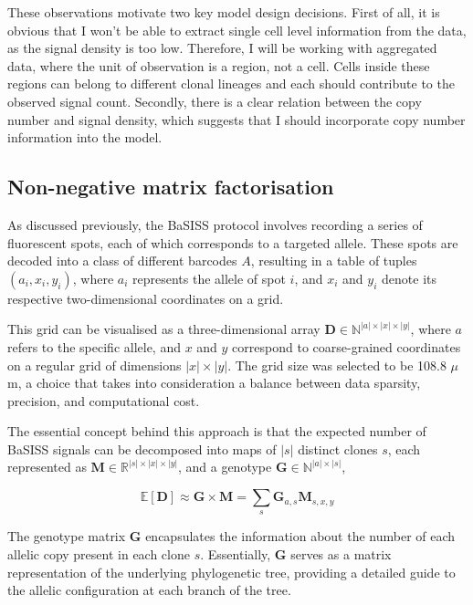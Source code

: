 These observations motivate two key model design decisions. First of all, it is obvious that I won't be able to extract single cell level information from the data, as the signal density is too low. Therefore, I will be working with aggregated data, where the unit of observation is a region, not a cell. Cells inside these regions can belong to different clonal lineages and each should contribute to the observed signal count. Secondly, there is a clear relation between the copy number and signal density, which suggests that I should incorporate copy number information into the model.

\subsection{Non-negative matrix factorisation}
As discussed previously, the \ac{BaSISS} protocol involves recording a series of fluorescent spots, each of which corresponds to a targeted allele. These spots are decoded into a class of different barcodes $A$, resulting in a table of tuples $(a_i, x_i, y_i)$, where $a_i$ represents the allele of spot $i$, and $x_i$ and $y_i$ denote its respective two-dimensional coordinates on a grid.

This grid can be visualised as a three-dimensional array $\mathbf{D} \in \mathbb{N}^{|a| \times |x| \times |y|}$, where $a$ refers to the specific allele, and $x$ and $y$ correspond to coarse-grained coordinates on a regular grid of dimensions $|x| \times |y|$. The grid size was selected to be 108.8 $\mu$ m, a choice that takes into consideration a balance between data sparsity, precision, and computational cost.

The essential concept behind this approach is that the expected number of \ac{BaSISS} signals can be decomposed into maps of $|s|$ distinct clones $s$, each represented as $\mathbf{M} \in \mathbb{R}^{|s| \times |x| \times |y|}$, and a genotype $\mathbf{G} \in \mathbb{N}^{|a| \times |s|}$,

\begin{equation}
    \mathbb{E}[\mathbf{D}] \approx \mathbf{G} \times \mathbf{M} = \sum_{s} \mathbf{G}_{a, s} \mathbf{M}_{s, x, y}
    \label{eq:ED}
\end{equation}

The genotype matrix $\mathbf{G}$ encapsulates the information about the number of each allelic copy present in each clone $s$. Essentially, $\mathbf{G}$ serves as a matrix representation of the underlying phylogenetic tree, providing a detailed guide to the allelic configuration at each branch of the tree. 


